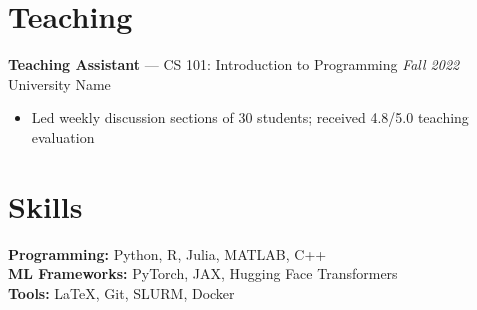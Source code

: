 \documentclass[11pt,a4paper]{article}
\begin{document}
\section{Teaching}
\textbf{Teaching Assistant} — CS 101: Introduction to Programming \hfill \textit{Fall 2022} \\
University Name \\
\begin{itemize}[leftmargin=*, noitemsep, topsep=2pt]
  \item Led weekly discussion sections of 30 students; received 4.8/5.0 teaching evaluation
\end{itemize}

\section{Skills}
\textbf{Programming:} Python, R, Julia, MATLAB, C++ \\
\textbf{ML Frameworks:} PyTorch, JAX, Hugging Face Transformers \\
\textbf{Tools:} LaTeX, Git, SLURM, Docker
\end{document}
